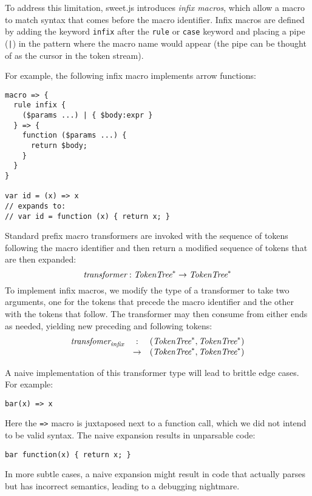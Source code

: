 \documentclass[preprint,10pt]{sigplanconf}
\begin{document}
To address this limitation, sweet.js introduces \emph{infix macros},
which allow a macro to match syntax that comes before the macro
identifier. Infix macros are defined by adding the keyword
\verb!infix! after the \verb!rule! or \verb!case!
keyword and placing a pipe (\verb!|!) in the pattern where the
macro name would appear (the pipe can be thought of as the cursor in
the token stream).

For example, the following infix macro implements arrow functions:
\begin{lstlisting}
macro => {
  rule infix {
    ($params ...) | { $body:expr }
  } => {
    function ($params ...) {
      return $body; 
    }
  }
}

var id = (x) => x
// expands to:
// var id = function (x) { return x; }
\end{lstlisting}


Standard prefix macro transformers are invoked with the sequence of
tokens following the macro identifier and then return a modified
sequence of tokens that are then expanded:
\[
\textit{transformer} : \textit{TokenTree}^* \rightarrow \textit{TokenTree}^*
\]
To implement infix macros, we modify the type of a transformer to
take two arguments, one for the tokens that precede the macro
identifier and the other with the tokens that follow. The transformer
may then consume from either ends as needed, yielding new preceding
and following tokens:
\[
\begin{array}{rcl}
  \textit{transfomer}_{\textit{infix}} &:& (\textit{TokenTree}^*, \textit{TokenTree}^*) 
  \\
  &\rightarrow& (\textit{TokenTree}^*, \textit{TokenTree}^*)
\end{array}
\]

A naive implementation of this transformer type will lead to brittle
edge cases. For example:
\begin{lstlisting}
bar(x) => x
\end{lstlisting}
Here the \verb!=>! macro is juxtaposed next to a function call,
which we did not intend to be valid syntax. The naive expansion results
in unparsable code:
\begin{lstlisting}
bar function(x) { return x; }
\end{lstlisting}

In more subtle cases, a naive expansion might result in code that
actually parses but has incorrect semantics, leading to a
debugging nightmare.
\end{document}
